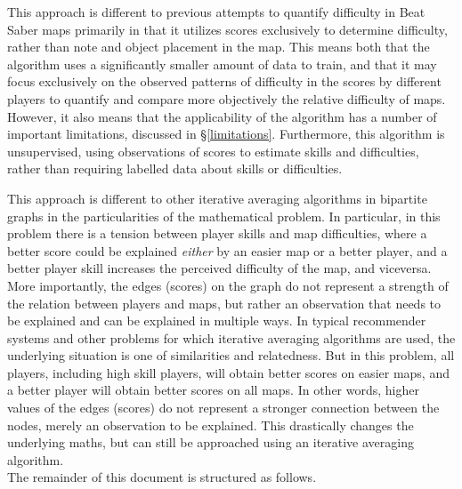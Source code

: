 \documentclass[12pt,a4paper]{article}
\begin{document}
This approach is different to previous attempts to quantify difficulty in Beat Saber maps primarily in that it utilizes scores exclusively to determine difficulty, rather than note and object placement in the map. This means both that the algorithm uses a significantly smaller amount of data to train, and that it may focus exclusively on the observed patterns of difficulty in the scores by different players to quantify and compare more objectively the relative difficulty of maps. However, it also means that the applicability of the algorithm has a number of important limitations, discussed in \S \ref{limitations}. Furthermore, this algorithm is unsupervised, using observations of scores to estimate skills and difficulties, rather than requiring labelled data about skills or difficulties.

This approach is different to other iterative averaging algorithms in bipartite graphs \cite{consensus_bipartite_graphs, iterative_algorithm_priority_pairwise, averaging_process_bipartite_graphs} in the particularities of the mathematical problem. In particular, in this problem there is a tension between player skills and map difficulties, where a better score could be explained {\emph{either}} by an easier map or a better player, and a better player skill increases the perceived difficulty of the map, and viceversa. More importantly, the edges (scores) on the graph do not represent a strength of the relation between players and maps, but rather an observation that needs to be explained and can be explained in multiple ways. In typical recommender systems and other problems for which iterative averaging algorithms are used, the underlying situation is one of similarities and relatedness. But in this problem, all players, including high skill players, will obtain better scores on easier maps, and a better player will obtain better scores on all maps. In other words, higher values of the edges (scores) do not represent a stronger connection between the nodes, merely an observation to be explained. This drastically changes the underlying  maths, but can still be approached using an iterative averaging algorithm.\\

The remainder of this document is structured as follows.
\end{document}
